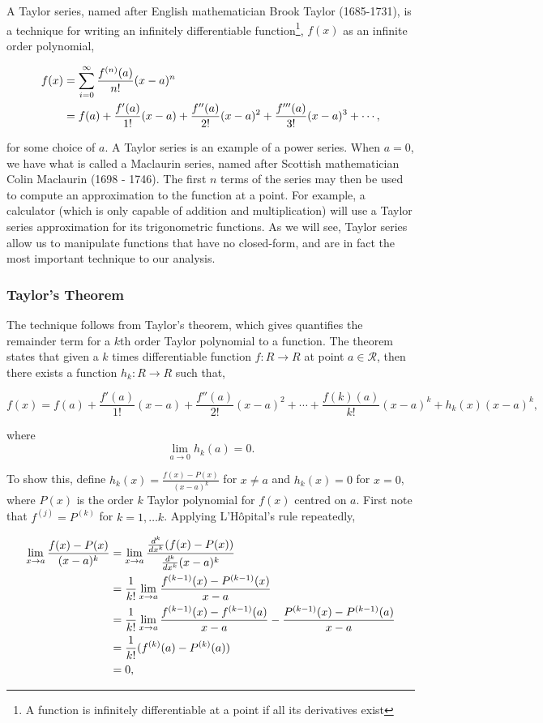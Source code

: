 \documentclass[11pt]{amsart}
\begin{document}
A Taylor series, named after English mathematician Brook Taylor (1685-1731), is a technique for writing an infinitely differentiable function\footnote{A function is infinitely differentiable at a point if all its derivatives exist}, $f(x)$ as an infinite order polynomial,

\begin{align}
f(x) &= \sum_{i = 0}^{\infty} \frac{f^{(n)}(a)}{n!}(x - a)^n \notag \\
&= f(a) + \frac{f'(a)}{1!}(x - a) + \frac{f''(a)}{2!}(x - a)^2 + \frac{f'''(a)}{3!}(x - a)^3 + \cdots \notag,
\end{align}

for some choice of $a$. A Taylor series is an example of a power series. When $a = 0$, we have what is called a Maclaurin series, named after Scottish mathematician Colin Maclaurin (1698 - 1746). The first $n$ terms of the series may then be used to compute an approximation to the function at a point. For example, a calculator (which is only capable of addition and multiplication) will use a Taylor series approximation for its trigonometric functions. As we will see, Taylor series allow us to manipulate functions that have no closed-form, and are in fact the most important technique to our analysis.

\subsubsection{Taylor's Theorem}

The technique follows from Taylor's theorem, which gives quantifies the remainder term for a $k$th order Taylor polynomial to a function. The theorem states that given a $k$ times differentiable function $f : R \to R$ at point $a \in \mathcal{R}$, then there exists a function $h_k : R \to R$ such that,

$$f(x) = f(a) + \frac{f'(a)}{1!}(x - a) + \frac{f''(a)}{2!}(x - a)^2 + \cdots  + \frac{f(k)(a)}{k!}(x - a)^k + h_k(x)(x - a)^k,$$

where $$\lim_{a \to 0}h_k(a) = 0.$$

To show this, define $h_k(x) = \frac{f(x) - P(x)}{(x - a)^k}$ for $x \neq a$ and $h_k(x) = 0$ for $x = 0$, where $P(x)$ is the order $k$ Taylor polynomial for $f(x)$ centred on $a$. First note that $f^{(j)} = P^{(k)}$ for $k = 1, \dots k$. Applying L'H\^{o}pital's rule repeatedly,

\begin{align}
\lim_{x \to a} \frac{f(x) - P(x)}{(x - a)^k} &= \lim_{x \to a} \frac{\frac{d^k}{dx^k}(f(x) - P(x))}{\frac{d^k}{dx^k}(x - a)^k} \notag \\
&= \frac{1}{k!}\lim_{x \to a} \frac{f^{(k-1)}(x) - P^{(k-1)}(x)}{x - a} \notag \\
&= \frac{1}{k!}\lim_{x \to a} \frac{f^{(k-1)}(x) - f^{(k-1)}(a)}{x - a} - \frac{P^{(k-1)}(x) - P^{(k-1)}(a)}{x - a} \notag \\
&= \frac{1}{k!}(f^{(k)}(a) - P^{(k)}(a)) \label{eq:taylor} \\
&= 0, \notag
\end{align}
\end{document}
